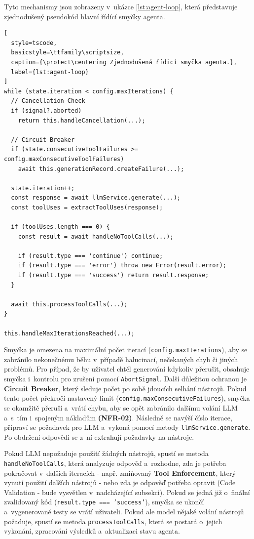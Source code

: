 \documentclass[czech, ing, kiv, he, iso690numb, viewonly]{fasthesis}
\begin{document}
Tyto mechanismy jsou zobrazeny v~ukázce \ref{lst:agent-loop}, která představuje zjednodušený pseudokód hlavní řídící smyčky agenta.

\begin{lstlisting}[
  style=tscode,
  basicstyle=\ttfamily\scriptsize,
  caption={\protect\centering Zjednodušená řídicí smyčka agenta.},
  label={lst:agent-loop}
]
while (state.iteration < config.maxIterations) {
  // Cancellation Check  
  if (signal?.aborted)
    return this.handleCancellation(...);

  // Circuit Breaker  
  if (state.consecutiveToolFailures >= config.maxConsecutiveToolFailures)
    await this.generationRecord.createFailure(...);

  state.iteration++;
  const response = await llmService.generate(...);
  const toolUses = extractToolUses(response);

  if (toolUses.length === 0) {
    const result = await handleNoToolCalls(...);

    if (result.type === 'continue') continue;
    if (result.type === 'error') throw new Error(result.error);
    if (result.type === 'success') return result.response;
  }

  await this.processToolCalls(...);
}

this.handleMaxIterationsReached(...);

\end{lstlisting}



Smyčka je omezena na maximální počet iterací (\texttt{config.maxIterations}), 
aby se zabránilo nekonečnému běhu v~případě halucinací, nečekaných chyb či jiných problémů.
Pro případ, že by uživatel chtěl generování kdykoliv přerušit, obsahuje smyčka i~kontrolu pro zrušení pomocí \texttt{AbortSignal}.
Další důležitou ochranou je \textbf{Circuit Breaker}, který sleduje počet po sobě jdoucích selhání nástrojů.
Pokud tento počet překročí nastavený limit (\texttt{config.maxConsecutiveFailures}), smyčka se okamžitě přeruší a~vrátí chybu, 
aby se opět zabránilo dalšímu volání LLM a~s~tím i~spojeným nákladům \textbf{(NFR-02)}. Následně se navýší číslo iterace, připraví se požadavek 
pro LLM a~vykoná pomocí metody \texttt{llmService.generate}. 
Po obdržení odpovědi se z~ní extrahují požadavky na nástroje. 

Pokud LLM nepožaduje použití žádných nástrojů, spustí se metoda \texttt{handleNoToolCalls}, 
která analyzuje odpověď a~rozhodne, zda je potřeba pokračovat v~dalších iteracích - 
např. zmiňovaný \textbf{Tool Enforcement}, který vynutí použití dalších nástrojů - nebo zda 
je odpověď potřeba opravit (Code Validation - bude vysvětlen v~nadcházející subsekci). 
Pokud se jedná již o~finální zvalidovaný kód (\texttt{result.type === 'success'}), 
smyčka se ukončí a~vygenerované testy se vrátí uživateli.
Pokud ale model nějaké volání nástrojů požaduje,
spustí se metoda \texttt{processToolCalls}, která se postará o~jejich vykonání, zpracování výsledků a~aktualizaci stavu agenta.
\end{document}

